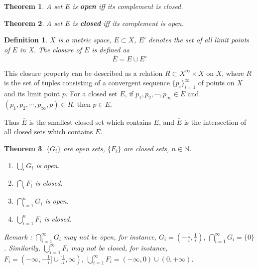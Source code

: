 \documentclass[aps,pra,onecolumn,notitlepage,superscriptaddress]{revtex4-1}
\newcommand{\N}{\mathbb{N}}
\newtheorem{theo}{Theorem}
\newtheorem{defi}{Definition}
\begin{document}
    \begin{theo}
        A set $E$ is \textbf{open} iff its complement is closed.
    \end{theo}
    \begin{theo}
        A set $E$ is \textbf{closed} iff its complement is open.
    \end{theo}

    \begin{defi}
        $X$ is a metric space, $E \subset X$, $E'$ denotes the set of all limit points of $E$ in X. The closure of $E$ is defined as
        \begin{equation}
            \overline{E} = E \cup E'
        \end{equation}
    \end{defi}

    This closure property can be described as a relation $R \subset X^{\infty} \times X$ on $X$, where $R$ is the set of tuples consisting of a convergent sequence $\{p_i\}_{i=1}^{\infty}$ of points on $X$ and its limit point $p$. For a closed set $E$, if $p_1, p_2, \cdots, p_{\infty} \in E$ and $(p_1, p_2, \cdots, p_{\infty}, p) \in R$, then $p \in E$. 
    
    Thus $\overline{E}$ is the smallest closed set which contains $E$, and $\overline{E}$ is the intersection of all closed sets which contains $E$.

    \begin{theo}
        $\{G_i\}$ are open sets, $\{F_i\}$ are closed sets, $n \in \N$.
        \begin{enumerate}
            \item $\bigcup_{i} G_i$ is open.
            \item $\bigcap_{i} F_i$ is closed.
            \item $\bigcap_{i=1}^n G_i$ is open.
            \item $\bigcup_{i=1}^n F_i$ is closed.
        \end{enumerate}
        Remark : $\bigcap_{i=1}^{\infty} G_i$ may not be open, for instance, $G_i = (-\frac{1}{i}, \frac{1}{i}), \ \bigcap_{i=1}^{\infty} G_i = \{0\}$. Similarily, $\bigcup_{i=1}^\infty F_i$ may not be closed, for instance, $F_i = (-\infty, -\frac{1}{i}]\cup [\frac{1}{i}, \infty), \ \bigcup_{i=1}^{\infty} F_i = (-\infty, 0) \cup (0, +\infty)$.
    \end{theo}
\end{document}
